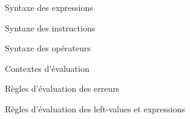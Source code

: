 
\begin{figure}
\figstxdata{}
\caption{Syntaxe des expressions}
\end{figure}

\begin{figure}
\figstxinstr{}
\caption{Syntaxe des instructions}
\end{figure}

\begin{figure}[h]
\figstxops{}

\caption{Syntaxe des opérateurs}
\end{figure}

\begin{figure}

    \figctx{}

\caption{Contextes d'évaluation}
\end{figure}

\begin{figure}

\begin{mathpar}




\end{mathpar}

\caption{Règles d'évaluation des erreurs}
\end{figure}

\begin{figure}

\begin{mathpar}


















\end{mathpar}

\caption{Règles d'évaluation des left-values et expressions }
\end{figure}

